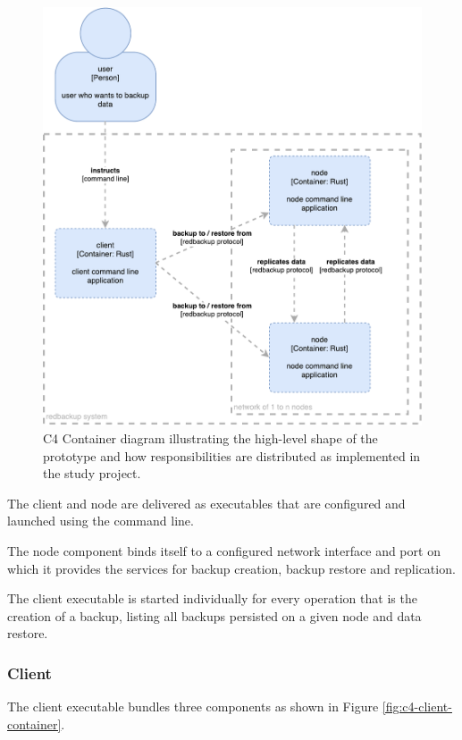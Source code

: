\begin{figure}[h]
	\centering
	\includegraphics[width=0.8\linewidth]{resources/c4-sa-container}
	\caption[Study Project specific C4 Container Diagram]{C4 Container diagram illustrating the high-level shape of the prototype and how responsibilities are distributed as implemented in the study project.}
	\label{fig:c4-sa-container}
\end{figure}

The \gls{client} and \gls{node} are delivered as executables that are configured and launched using the command line.

The \gls{node} component binds itself to a configured network interface and port on which it provides the services for backup creation, backup restore and replication.

The \gls{client} executable is started individually for every operation that is the creation of a backup, listing all backups persisted on a given \gls{node} and data restore.

\subsubsection{Client}

The \gls{client} executable bundles three components as shown in Figure \ref{fig:c4-client-container}.

